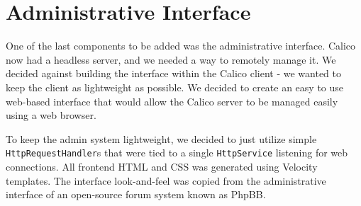 \section{Administrative Interface}
One of the last components to be added was the administrative interface. Calico now had a headless server, and we needed a way to remotely manage it. We decided against building the interface within the Calico client - we wanted to keep the client as lightweight as possible. 
We decided to create an easy to use web-based interface that would allow the Calico server to be managed easily using a web browser.

To keep the admin system lightweight, we decided to just utilize simple \texttt{HttpRequestHandler}s that were tied to a single \texttt{HttpService} listening for web connections. All frontend HTML and CSS was generated using Velocity\cite{todo} templates. The interface look-and-feel was copied from the administrative interface of an open-source forum system known as PhpBB\cite{todo}.

